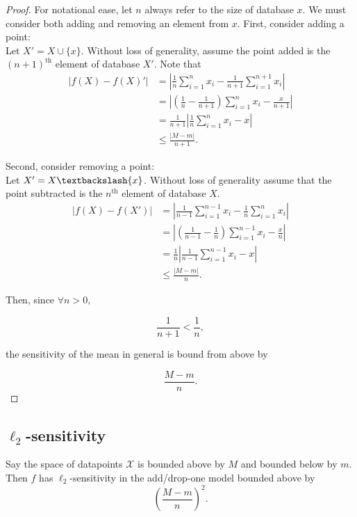 \documentclass[11pt]{scrartcl} %
\begin{document}
\begin{proof}
For notational ease, let $n$ always refer to the size of database $x$. We must consider both adding and removing an element from $x$. First, consider adding a point:\\

Let $X' = X \cup \{x\}$. Without loss of generality, assume the point added is the $(n+1)^{\text{th}}$ element of database $X'$. Note that
\begin{align*}
\left \vert f(X) - f(X)' \right\vert &= \left\vert \frac{1}{n} \sum_{i=1}^n x_i - \frac{1}{n+1} \sum_{i=1}^{n+1} x_i \right\vert \\
	&= \left\vert \left(\frac{1}{n} - \frac{1}{n+1}\right) \sum_{i=1}^n x_i - \frac{x}{n+1}\right\vert \\
	&= \frac{1}{n+1} \left\vert \frac{1}{n} \sum_{i=1}^n x_i - x \right\vert \\
	&\le \frac{ \left\vert M - m \right\vert}{n+1}.
\end{align*}

Second, consider removing a point: \\
Let $X' = X\textbackslash\{x\}$. Without loss of generality assume that the point subtracted is the $n^{\text{th}}$ element of database $X$.
\begin{align*}
\left \vert f(X) - f(X') \right\vert &= \left\vert \frac{1}{n-1} \sum_{i=1}^{n-1} x_i - \frac{1}{n} \sum_{i=1}^n x_i \right\vert \\
	&= \left\vert \left(\frac{1}{n-1} - \frac{1}{n}\right) \sum_{i=1}^{n-1} x_i - \frac{x}{n}\right\vert \\
	&= \frac{1}{n} \left\vert \frac{1}{n-1} \sum_{i=1}^{n-1} x_i  - x \right\vert \\
	&\le \frac{\left\vert M-m\right\vert}{n}.
\end{align*}

Then, since $\forall n > 0,$

$$ \frac{1}{n+1} < \frac{1}{n},$$

the sensitivity of the mean in general is bound from above by 

$$ \frac{M-m}{n}.$$
\end{proof}

\subsection{$\ell_2$-sensitivity}

\begin{theorem}
Say the space of datapoints $\mathcal{X}$ is bounded above by $M$ and bounded below by $m$. Then $f$ has $\ell_2$-sensitivity in the add/drop-one model bounded above by
	$$ \left( \frac{M-m}{n} \right)^2. $$
\end{theorem}
\end{document}
